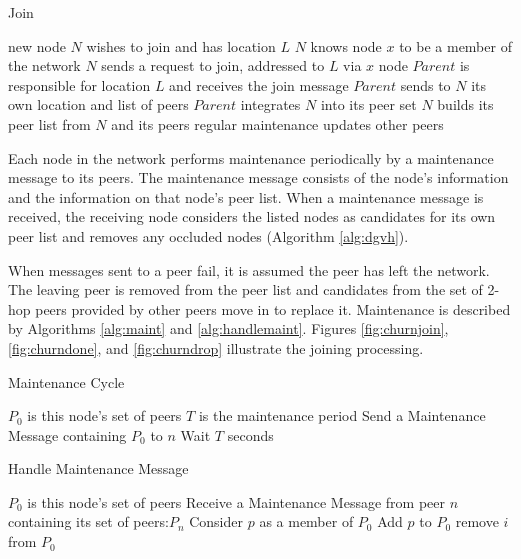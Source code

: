 \begin{algorithm}
	\caption{Join}
	\label{alg:join}
	\begin{algorithmic}[1]  %
		\State new node $N$ wishes to join and has location $L$
		\State  $N$ knows node $x$ to be a member of the network
		\State  $N$ sends a request to join, addressed to $L$ via $x$
		\State  node $Parent$ is responsible for location $L$ and receives the join message
		\State  $Parent$ sends to $N$ its own location and list of peers
		\State  $Parent$ integrates $N$ into its peer set
		\State  $N$ builds its peer list from $N$ and its peers
		\State regular maintenance updates other peers
	\end{algorithmic}
\end{algorithm}


Each node in the network performs maintenance periodically by a maintenance message to its peers. The maintenance message consists of the node's information and the information on that node's peer list. When a maintenance message is received, the receiving node considers the listed nodes as candidates for its own peer list and removes any occluded nodes (Algorithm \ref{alg:dgvh}). 




When messages sent to a peer fail, it is assumed the peer has left the network. The leaving peer is removed from the peer list and candidates from the set of 2-hop peers provided by other peers move in to replace it.  Maintenance is described by Algorithms \ref{alg:maint} and \ref{alg:handlemaint}.  Figures \ref{fig:churnjoin}, \ref{fig:churndone}, and \ref{fig:churndrop} illustrate the joining processing.

\begin{algorithm}
	\caption{Maintenance Cycle}
	\label{alg:maint}
	\begin{algorithmic}[1]  %
		\State $P_0$ is this node's set of peers
		\State $T$ is the maintenance period
		\State Send a Maintenance Message containing $P_0$ to $n$
		\EndFor
		\State Wait $T$ seconds
		\EndWhile
	\end{algorithmic}
\end{algorithm}


\begin{algorithm}
	\caption{Handle Maintenance Message}
	\label{alg:handlemaint}
	\begin{algorithmic}[1]  %
		\State $P_0$ is this node's set of peers
		\State Receive a Maintenance Message from peer $n$ containing its set of peers:$P_n$
		\State Consider $p$ as a member of $P_0$
		\State Add $p$ to $P_0$
		\State remove $i$ from $P_0$
		\EndIf
		\EndFor
		\EndIf
		\EndFor
	\end{algorithmic}
\end{algorithm}




